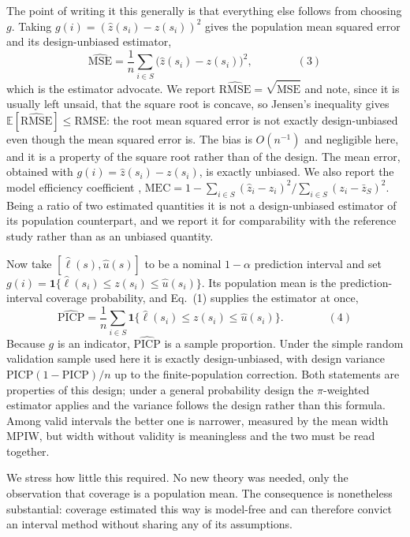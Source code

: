 \documentclass[preprint,12pt,authoryear]{elsarticle}
\newcommand{\eqnum}[1]{\qquad\qquad\mathrm{(#1)}}
\begin{document}
The point of writing it this generally is that everything else follows from
choosing $g$. Taking $g(i) = (\hat z(s_i)-z(s_i))^2$ gives the population mean
squared error and its design-unbiased estimator,
\[
\widehat{\mathrm{MSE}} = \frac{1}{n}\sum_{i \in S}\big(\hat z(s_i)-z(s_i)\big)^2 ,
\eqnum{3}
\]
which is the estimator \citet{wadoux2021} advocate. We report
$\widehat{\mathrm{RMSE}} = \sqrt{\widehat{\mathrm{MSE}}}$ and note, since it is
usually left unsaid, that the square root is concave, so Jensen's inequality
gives $\mathbb{E}[\widehat{\mathrm{RMSE}}] \le \mathrm{RMSE}$: the root mean
squared error is not exactly design-unbiased even though the mean squared error
is. The bias is $O(n^{-1})$ and negligible here, and it is a property of the
square root rather than of the design. The mean error, obtained with
$g(i) = \hat z(s_i)-z(s_i)$, is exactly unbiased. We also report the model efficiency coefficient \citep{nash1970},
$\mathrm{MEC} = 1 - \sum_{i \in S}(\hat z_i - z_i)^2 / \sum_{i \in S}(z_i - \bar z_S)^2$.
Being a ratio of two estimated quantities it is not a design-unbiased estimator
of its population counterpart, and we report it for comparability with the
reference study rather than as an unbiased quantity.

Now take $[\hat \ell(s), \hat u(s)]$ to be a nominal $1-\alpha$ prediction
interval and set $g(i) = \mathbf{1}\{\hat \ell(s_i) \le z(s_i) \le \hat u(s_i)\}$.
Its population mean is the prediction-interval coverage probability, and Eq.~(1)
supplies the estimator at once,
\[
\widehat{\mathrm{PICP}} = \frac{1}{n}\sum_{i \in S}
\mathbf{1}\{\hat \ell(s_i) \le z(s_i) \le \hat u(s_i)\}.
\eqnum{4}
\]
Because $g$ is an indicator, $\widehat{\mathrm{PICP}}$ is a sample proportion.
Under the simple random validation sample used here it is exactly
design-unbiased, with design variance $\mathrm{PICP}(1-\mathrm{PICP})/n$ up to
the finite-population correction. Both statements are properties of this design;
under a general probability design the $\pi$-weighted estimator applies and the
variance follows the design rather than this formula. Among
valid intervals the better one is narrower, measured by the mean width
$\mathrm{MPIW}$, but width without validity is meaningless and the two must be
read together.

We stress how little this required. No new theory was needed, only the
observation that coverage is a population mean. The consequence is nonetheless
substantial: coverage estimated this way is model-free and can therefore convict
an interval method without sharing any of its assumptions.
\end{document}
